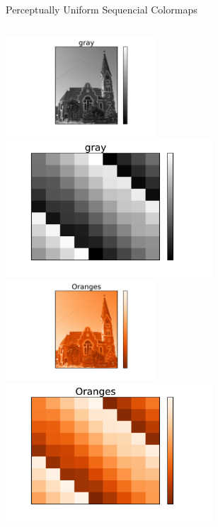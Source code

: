 \documentclass{beamer}
\newcommand{\semitransp}[2][35]{\color{fg!#1}#2}
\begin{document}
\begin{frame}
\begin{center}
\semitransp[0]{Perceptually Uniform Sequencial Colormaps}
\end{center}
\begin{columns}
\begin{column}{0.5\textwidth}
\begin{center}
\vfill
\includegraphics[width=0.42\textwidth]{church_gray.pdf}
\includegraphics[width=0.58\textwidth]{magicsquare_gray.pdf}\newline\newline
\vfill
\includegraphics[width=0.42\textwidth]{church_Oranges.pdf}
\includegraphics[width=0.58\textwidth]{magicsquare_Oranges.pdf}
\vfill
\end{center}

\end{column}
\end{columns}
\end{frame}
\end{document}
